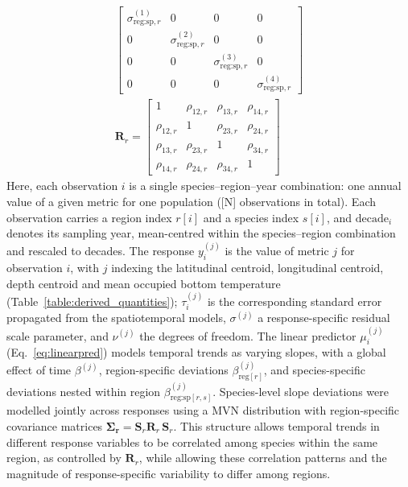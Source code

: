 \documentclass[9pt,twocolumn,twoside]{pnas-new}
\begin{document}
{\begin{gather}
\begin{bmatrix}
\sigma^{(1)}_{\text{reg:sp},r} & 0 & 0 & 0 \\
0 & \sigma^{(2)}_{\text{reg:sp},r} & 0 & 0 \\
0 & 0 & \sigma^{(3)}_{\text{reg:sp},r} & 0 \\
0 & 0 & 0 & \sigma^{(4)}_{\text{reg:sp},r}
\end{bmatrix} \label{eq:sdmatrix}
\\
\mathbf{R}_{r} =
\begin{bmatrix}
1 & \rho_{12,r} & \rho_{13,r} & \rho_{14,r} \\
\rho_{12,r} & 1 & \rho_{23,r} & \rho_{24,r} \\
\rho_{13,r} & \rho_{23,r} & 1 & \rho_{34,r} \\
\rho_{14,r} & \rho_{24,r} & \rho_{34,r} & 1
\end{bmatrix} \label{eq:corrmatrix}
\end{gather}
\noindent Here, each observation $i$ is a single species--region--year combination: one annual value of a given metric for one population ([N] observations in total). Each observation carries a region index $r[i]$ and a species index $s[i]$, and $\mathrm{decade}_i$ denotes its sampling year, mean-centred within the species--region combination and rescaled to decades. The response $y^{(j)}_i$ is the value of metric $j$ for observation $i$, with $j$ indexing the latitudinal centroid, longitudinal centroid, depth centroid and mean occupied bottom temperature (Table~\ref{table:derived_quantities}); $\tau^{(j)}_i$ is the corresponding standard error propagated from the spatiotemporal models, $\sigma^{(j)}$ a response-specific residual scale parameter, and $\nu^{(j)}$ the degrees of freedom. The linear predictor $\mu^{(j)}_i$ (Eq.~\ref{eq:linearpred}) models temporal trends as varying slopes, with a global effect of time $\beta^{(j)}$, region-specific deviations $\beta^{(j)}_{\text{reg}[r]}$, and species-specific deviations nested within region $\beta^{(j)}_{\text{reg:sp}[r,s]}$.
Species-level slope deviations were modelled jointly across responses using a MVN distribution with region-specific covariance matrices $\boldsymbol{\Sigma_r} = \mathbf{S}_{r}\mathbf{R}_{r}\,\mathbf{S}_{r}$. This structure allows temporal trends in different response variables to be correlated among species within the same region, as controlled by $\mathbf{R}_{r}$, while allowing these correlation patterns and the magnitude of response-specific variability to differ among regions.
}
\end{document}
